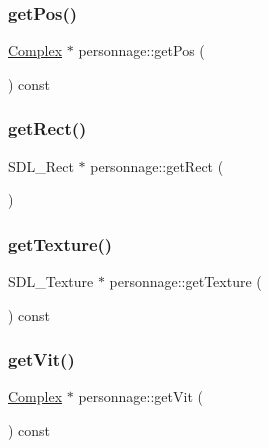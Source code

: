 \mbox{\label{classpersonnage_a26182b2cf14bbf5abf25c6fae0ba3e47}} 
\subsubsection{\texorpdfstring{get\+Pos()}{getPos()}}
{\footnotesize\ttfamily \hyperlink{classComplex}{Complex} $\ast$ personnage\+::get\+Pos (\begin{DoxyParamCaption}{ }\end{DoxyParamCaption}) const}

\mbox{\label{classpersonnage_acc097b6266a023b5c7eb4eef1111378b}} 
\subsubsection{\texorpdfstring{get\+Rect()}{getRect()}}
{\footnotesize\ttfamily S\+D\+L\+\_\+\+Rect $\ast$ personnage\+::get\+Rect (\begin{DoxyParamCaption}{ }\end{DoxyParamCaption})}

\mbox{\label{classpersonnage_a4945e1194417822b5c50f71418522dc2}} 
\subsubsection{\texorpdfstring{get\+Texture()}{getTexture()}}
{\footnotesize\ttfamily S\+D\+L\+\_\+\+Texture $\ast$ personnage\+::get\+Texture (\begin{DoxyParamCaption}{ }\end{DoxyParamCaption}) const}

\mbox{\label{classpersonnage_a3c98da8dfc7f5c1dae8cb8fb85726c9f}} 
\subsubsection{\texorpdfstring{get\+Vit()}{getVit()}}
{\footnotesize\ttfamily \hyperlink{classComplex}{Complex} $\ast$ personnage\+::get\+Vit (\begin{DoxyParamCaption}{ }\end{DoxyParamCaption}) const}

